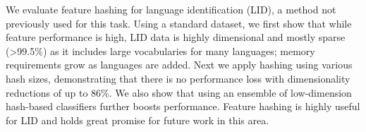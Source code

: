 We evaluate feature hashing for language identification (LID), a method not previously used for this task. Using a standard dataset, we first show that while feature performance is high, LID data is highly dimensional and mostly sparse (>99.5\%) as it includes large vocabularies for many languages; memory requirements grow as languages are added. Next we apply hashing using various hash sizes, demonstrating that there is no performance loss with dimensionality reductions of up to 86\%. We also show that using an ensemble of low-dimension hash-based classifiers further boosts performance. Feature hashing is highly useful for LID and holds great promise for future work in this area.
